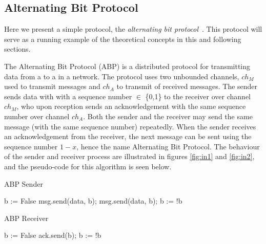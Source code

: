 \subsection{Alternating Bit Protocol}
Here we present a simple protocol, the \emph{alternating bit protocol}~\cite{bartlett1969note}. This protocol will serve as a running example of the theoretical concepts in this and following sections.

The Alternating Bit Protocol (ABP)\cite{foldoc} is a distributed protocol for transmitting data from a  to a  in a network. The protocol uses two unbounded channels, $ch_M$ used to transmit messages and $ch_A$ to transmit  of received messages. The sender sends data with with a sequence number  $\in$ \{0,1\} to the receiver over channel $ch_M$, who upon reception sends an acknowledgement with the same sequence number over channel $ch_A$. Both the sender and the receiver may send the same message (with the same sequence number) repeatedly. When the sender receives an acknowledgement from the receiver, the next message can be sent using the sequence number $1-x$, hence the name Alternating Bit Protocol. The behaviour of the sender and receiver process are illustrated in figures \ref{fig:in1} and \ref{fig:in2}, and the pseudo-code for this algorithm is seen below.

\begin{algorithm}
  \caption{ABP Sender}
  \label{senderpseudo}
\begin{algorithmic}[1]
    \State b := False 
      \State msg.send(data, b); 
       
      \State msg.send(data, b); 
      \EndWhile
      \State b := !b 
    \EndFor
\end{algorithmic}
\end{algorithm}


\begin{algorithm}
  \caption{ABP Receiver}
  \label{senderpseudo}
\begin{algorithmic}[1]
    \State b := False 
       
      \State ack.send(b); 
      \EndWhile
      \State b := !b 
    \EndFor
\end{algorithmic}
\end{algorithm}

